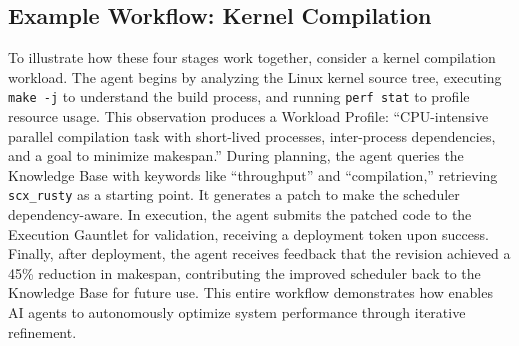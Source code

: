 \subsection{Example Workflow: Kernel Compilation}

To illustrate how these four stages work together, consider a kernel compilation workload. The agent begins by analyzing the Linux kernel source tree, executing \texttt{make -j} to understand the build process, and running \texttt{perf stat} to profile resource usage. This observation produces a Workload Profile: ``CPU-intensive parallel compilation task with short-lived processes, inter-process dependencies, and a goal to minimize makespan.'' During planning, the agent queries the Knowledge Base with keywords like ``throughput'' and ``compilation,'' retrieving \texttt{scx\_rusty} as a starting point. It generates a patch to make the scheduler dependency-aware. In execution, the agent submits the patched code to the Execution Gauntlet for validation, receiving a deployment token upon success. Finally, after deployment, the agent receives feedback that the revision achieved a 45\% reduction in makespan, contributing the improved scheduler back to the Knowledge Base for future use. This entire workflow demonstrates how \sys enables AI agents to autonomously optimize system performance through iterative refinement.

